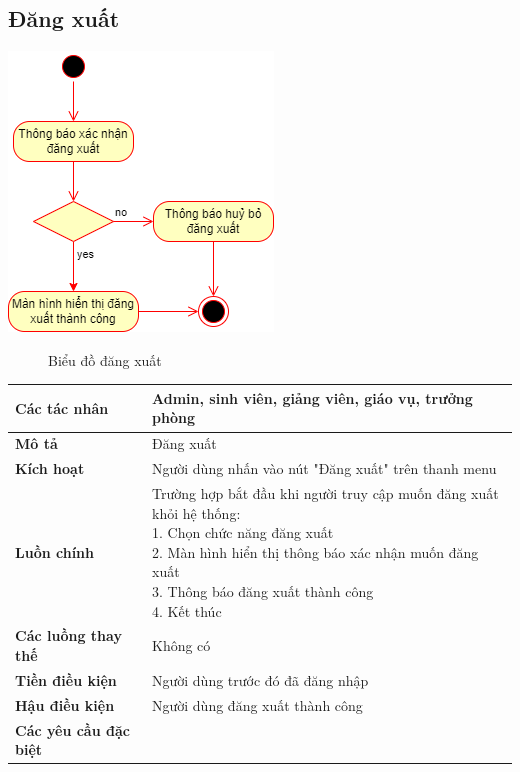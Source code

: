 \subsection{Đăng xuất}
  \begin{center}
    \includegraphics[width=.7\textwidth]{../drawio/activity/logout.png}
    \begin{figure}[h]
      \centering
      \caption{Biểu đồ đăng xuất}
    \end{figure}
  \end{center}
  \begin{tabular}{|l|l|}
    \hline
    \textbf{Các tác nhân} & Admin, sinh viên, giảng viên, giáo vụ, trưởng phòng \\
    \hline
    \textbf{Mô tả} & Đăng xuất\\
    \hline
    \textbf{Kích hoạt} & Người dùng nhấn vào nút "Đăng xuất" trên thanh menu \\
    \hline 
    \textbf{Luồn chính} & \makecell[l]{Trường hợp bắt đầu khi người truy cập muốn đăng xuất khỏi hệ thống: \\ 1. Chọn chức năng đăng xuất \\ 2. Màn hình hiển thị thông báo xác nhận muốn đăng xuất \\ 3. Thông báo đăng xuất thành công \\ 4. Kết thúc} \\
    \hline
    \textbf{Các luồng thay thế} & Không có \\
    \hline
    \textbf{Tiền điều kiện} & Người dùng trước đó đã đăng nhập \\
    \hline
    \textbf{Hậu điều kiện} & Người dùng đăng xuất thành công \\
    \hline
    \textbf{Các yêu cầu đặc biệt} & \\
    \hline
  \end{tabular}

